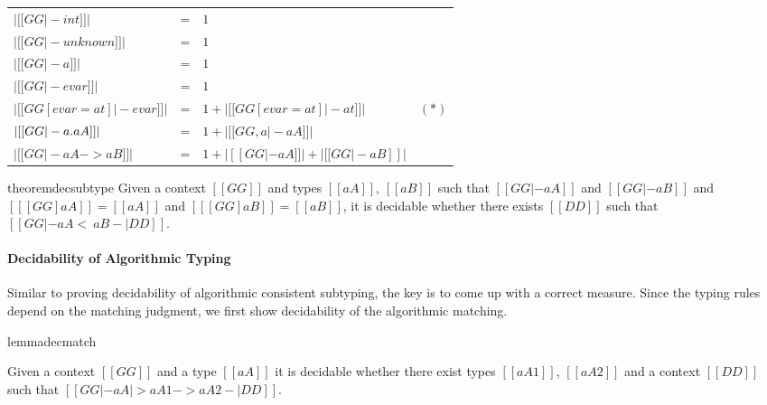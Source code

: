 \begin{definition} \leavevmode
  \begin{center}
  \begin{tabular}{llll}
    $|  [[GG |- int]] |$     &=&  $1$ \\
    $| [[GG |- unknown]]    |$  &=&  $1$ \\
    $|  [[GG |- a ]]  |$    &=&  $1$ \\
    $|  [[GG |- evar]]  |$    &=&  $1$ \\
    $|  [[ GG[evar = at] |- evar ]] |$    &=&  $1 + | [[  GG[evar = at] |- at   ]]   | $ & $(*)$ \\
    $|  [[ GG |- \/a . aA ]] |$    &=&  $1 + | [[  GG, a |- aA ]]   | $ \\
    $|  [[ GG |- aA -> aB ]] |$    &=&  $1 + | [[  GG |- aA ]]   | + | [[ GG |- aB ]] | $ \\
  \end{tabular}
\end{center}
\end{definition}


\begin{restatable}{theorem}{decsubtype} \label{thm:decsubtype}
  Given a context $[[GG]]$ and types $[[aA]]$, $[[aB]]$ such that $[[GG |- aA]]$ and
  $[[ GG |- aB ]]$ and $[[  [GG]aA  ]] = [[aA]]$ and $[[ [GG]aB ]] = [[aB]]$, it is decidable whether there exists $[[DD]]$ such that $[[ GG |- aA <~ aB -| DD    ]]$.
\end{restatable}


\paragraph{Decidability of Algorithmic Typing}


Similar to proving decidability of algorithmic consistent subtyping, the key is
to come up with a correct measure. Since the typing rules depend on the matching
judgment, we first show decidability of the algorithmic matching.

\begin{restatable}{lemma}{decmatch} \label{lemma:decmatch}%

  Given a context $[[GG]]$ and a type $[[aA]]$ it is decidable whether there
  exist types $[[aA1]]$, $[[aA2]]$ and a context $[[DD]]$ such that $[[ GG |- aA |> aA1 -> aA2 -| DD ]]$.
\end{restatable}

